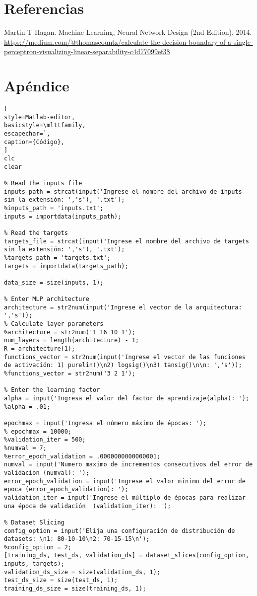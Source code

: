 \documentclass[6pt]{article}
\begin{document}
\section{Referencias}
Martin T Hagan. Machine Learning, Neural Network Design (2nd Edition), 2014.\\
\url{https://medium.com/@thomascountz/calculate-the-decision-boundary-of-a-single-perceptron-visualizing-linear-separability-c4d77099ef38}
\section{Apéndice}
\begin{lstlisting}[
style=Matlab-editor,
basicstyle=\mlttfamily,
escapechar=`,
caption={Código},
]
clc
clear

% Read the inputs file
inputs_path = strcat(input('Ingrese el nombre del archivo de inputs sin la extensión: ','s'), '.txt');
%inputs_path = 'inputs.txt';
inputs = importdata(inputs_path);

% Read the targets
targets_file = strcat(input('Ingrese el nombre del archivo de targets sin la extensión: ','s'), '.txt');
%targets_path = 'targets.txt';
targets = importdata(targets_path);

data_size = size(inputs, 1);

% Enter MLP architecture
architecture = str2num(input('Ingrese el vector de la arquitectura: ','s'));
% Calculate layer parameters
%architecture = str2num('1 16 10 1');
num_layers = length(architecture) - 1;
R = architecture(1);
functions_vector = str2num(input('Ingrese el vector de las funciones de activación: 1) purelin()\n2) logsig()\n3) tansig()\n\n: ','s'));
%functions_vector = str2num('3 2 1');

% Enter the learning factor
alpha = input('Ingresa el valor del factor de aprendizaje(alpha): ');
%alpha = .01;

epochmax = input('Ingresa el número máximo de épocas: ');
% epochmax = 10000;
%validation_iter = 500;
%numval = 7;
%error_epoch_validation = .0000000000000001;
numval = input('Numero maximo de incrementos consecutivos del error de validacion (numval): ');
error_epoch_validation = input('Ingrese el valor minimo del error de epoca (error_epoch_validation): ');
validation_iter = input('Ingrese el múltiplo de épocas para realizar una época de validación  (validation_iter): ');

% Dataset Slicing
config_option = input('Elija una configuración de distribución de datasets: \n1: 80-10-10\n2: 70-15-15\n');
%config_option = 2;
[training_ds, test_ds, validation_ds] = dataset_slices(config_option, inputs, targets);
validation_ds_size = size(validation_ds, 1);
test_ds_size = size(test_ds, 1);
training_ds_size = size(training_ds, 1);


\end{lstlisting}
\end{document}
